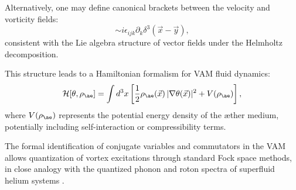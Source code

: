 Alternatively, one may define canonical brackets between the velocity and vorticity fields:
\begin{equation}
[v_i(\vec{x}), \omega_j(\vec{y})] \sim i \epsilon_{ijk} \partial_k \delta^3(\vec{x} - \vec{y}),
\end{equation}
consistent with the Lie algebra structure of vector fields under the Helmholtz decomposition.

This structure leads to a Hamiltonian formalism for VAM fluid dynamics:
\begin{equation}
\mathcal{H}[\theta, \rho_{\ae}] = \int d^3x \left[ \frac{1}{2} \rho_{\ae}(\vec{x})\, |\nabla \theta(\vec{x})|^2 + V(\rho_{\ae}) \right],
\end{equation}
where $V(\rho_{\ae})$ represents the potential energy density of the æther medium, potentially including self-interaction or compressibility terms.

The formal identification of conjugate variables and commutators in the VAM allows quantization of vortex excitations through standard Fock space methods, in close analogy with the quantized phonon and roton spectra of superfluid helium systems \cite{fetter1971nonuniform,stone2000superfluidity,verlinde2021qft}.


